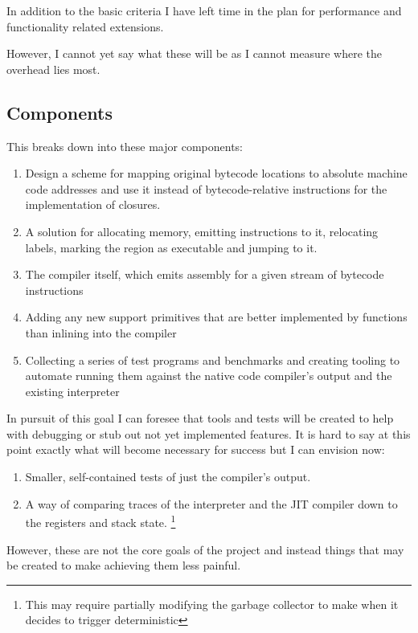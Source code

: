 \documentclass[12pt,a4paper, headings=standardclasses]{scrartcl}
\begin{document}
In addition to the basic criteria I have left time in the plan for
performance and functionality related extensions.

However, I cannot yet say what these will be as I cannot measure where the overhead lies most.

\subsection*{Components}

This breaks down into these major components:

\begin{enumerate}
    \item Design a scheme for mapping original bytecode locations to absolute
          machine code addresses and use it instead of bytecode-relative instructions
          for the implementation of closures.
    \item A solution for allocating memory, emitting instructions to it,
          relocating labels, marking the region as executable and jumping to it.
    \item The compiler itself, which emits assembly for a given stream of bytecode
          instructions
    \item Adding any new support primitives that are better implemented by functions
          than inlining into the compiler
    \item Collecting a series of test programs and benchmarks and creating
          tooling to automate running them against the native code compiler's
          output and the existing interpreter
\end{enumerate}

In pursuit of this goal I can foresee that tools and tests will be created to
help with debugging or stub out not yet implemented features. It is hard to
say at this point exactly what will become necessary for success but I can
envision now:

\begin{enumerate}
    \item Smaller, self-contained tests of just the compiler's output.
    \item A way of comparing traces of the interpreter and the JIT compiler down to the registers and stack state. \footnote{This may require partially modifying the garbage collector to make when it decides to trigger deterministic}
\end{enumerate}

However, these are not the core goals of the project and instead things that
may be created to make achieving them less painful.
\end{document}
